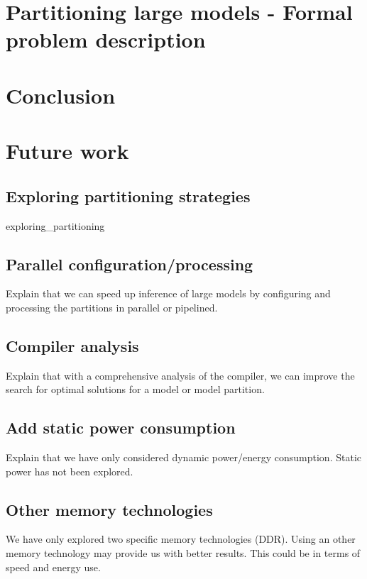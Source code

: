 \documentclass[11pt]{report}
\begin{document}

\chapter{Partitioning large models - Formal problem description}
\label{section:tmp}
\lipsum[1]

\chapter{Conclusion}
\lipsum[1]

\chapter{Future work}
\section{Exploring partitioning strategies}
{exploring_partitioning}
\section{Parallel configuration/processing}
Explain that we can speed up inference of large models by configuring and processing the partitions in parallel or pipelined.

\section{Compiler analysis}
Explain that with a comprehensive analysis of the compiler, we can improve the search for optimal solutions for a model or model partition.

\section{Add static power consumption}
Explain that we have only considered dynamic power/energy consumption.
Static power has not been explored.

\section{Other memory technologies}
We have only explored two specific memory technologies (DDR).
Using an other memory technology may provide us with better results.
This could be in terms of speed and energy use.
\end{document}
